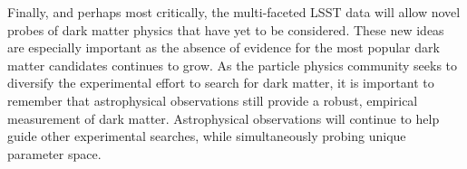 Finally, and perhaps most critically, the multi-faceted LSST data will allow novel probes of dark matter physics that have yet to be considered.
These new ideas are especially important as the absence of evidence for the most popular dark matter candidates continues to grow.
As the particle physics community seeks to diversify the experimental effort to search for dark matter, it is important to remember that astrophysical observations still provide a robust, empirical measurement of dark matter.
Astrophysical observations will continue to help guide other experimental searches, while simultaneously probing unique parameter space.

